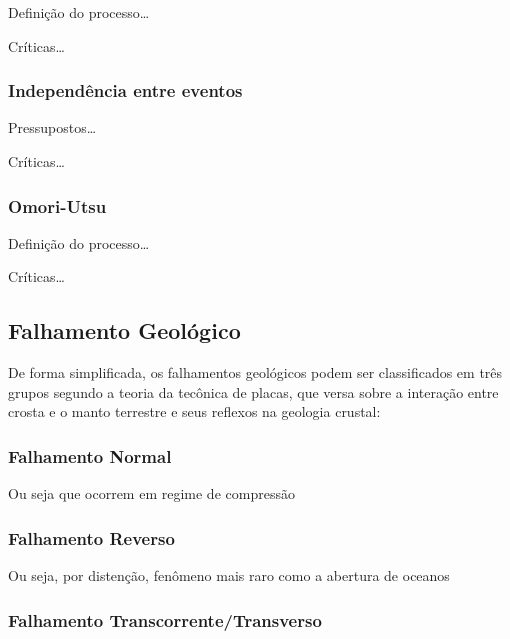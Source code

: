 Definição do processo\ldots

Críticas\ldots


\subsubsection{Independência entre eventos}
\label{sec:risco_sismico}

Pressupostos\ldots

Críticas\ldots


\subsubsection{Omori-Utsu}
\label{sec:risco_sismico}

Definição do processo\ldots

Críticas\ldots


\subsection{Falhamento Geológico}
\label{sec:risco_sismico}

De forma simplificada, os falhamentos geológicos podem ser classificados em três
grupos segundo a teoria da tecônica de placas, que versa sobre a interação
entre crosta e o manto terrestre e seus reflexos na geologia crustal:

\subsubsection{Falhamento Normal}
\label{sec:risco_sismico}

Ou seja que ocorrem em regime de compressão


\subsubsection{Falhamento Reverso}
\label{sec:risco_sismico}

Ou seja, por distenção, fenômeno mais raro como a abertura de oceanos 


\subsubsection{Falhamento Transcorrente/Transverso}
\label{sec:risco_sismico}

